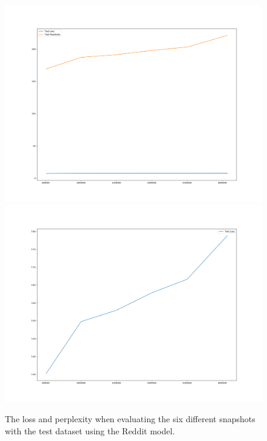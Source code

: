 \begin{figure}[H]
	\includegraphics[width=\linewidth]{img/plots/reddit/test_metrics_both.png}
	\centering
	\small
	\endminipage\hfill
	\includegraphics[width=\linewidth]{img/plots/reddit/test_metrics_loss.png}
	\centering
	\small
	\endminipage\hfill
	\caption{The loss and perplexity when evaluating the six different snapshots with the test dataset using the Reddit model.}
	\label{result:test_performance:reddit}
\end{figure}


